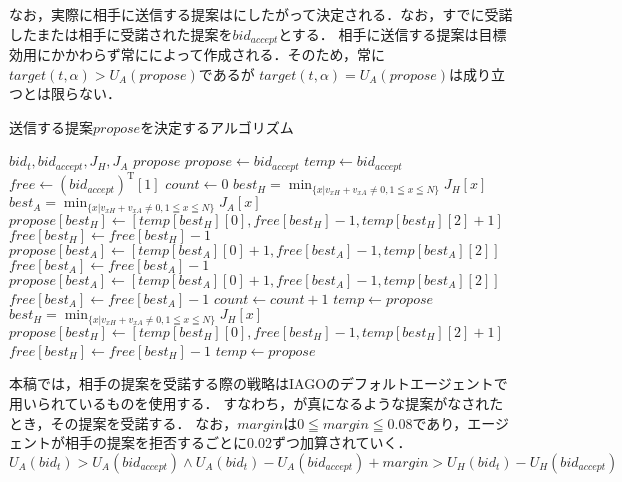 なお，実際に相手に送信する提案はにしたがって決定される．なお，すでに受諾したまたは相手に受諾された提案を$bid_{accept}$とする．
相手に送信する提案は目標効用にかかわらず常にによって作成される．そのため，常に$target(t,\alpha) > U_A(propose)$であるが
$target(t,\alpha) = U_A(propose)$は成り立つとは限らない．
\begin{algorithm}
    \caption{送信する提案$propose$を決定するアルゴリズム}\label{alg:bidding}
    \begin{algorithmic}[1]
        \renewcommand{\algorithmicrequire}{\textbf{Input:}}
        \renewcommand{\algorithmicensure}{\textbf{Output:}}
        \REQUIRE $bid_t,bid_{accept}, J_H, J_A$
        \ENSURE  $propose$
        \STATE $propose \leftarrow bid_{accept}$
        \STATE $temp \leftarrow bid_{accept}$
        \STATE $free \leftarrow (bid_{accept})^{\mathrm{T}}[1]$
        \STATE $count \leftarrow 0$
            \STATE $best_H = \displaystyle \min_{\{x | v_{xH} + v_{xA} \neq 0, 1 \leqq x \leqq N \} } J_H[x]$ 
            \STATE $best_A = \displaystyle \min_{\{x | v_{xH} + v_{xA} \neq 0, 1 \leqq x \leqq N \} } J_A[x]$ 
                \STATE $propose[best_H] \leftarrow [temp[best_H][0], free[best_H] - 1, temp[best_H][2] + 1]$
                \STATE $free[best_H] \leftarrow free[best_H] - 1$
                \STATE $propose[best_A] \leftarrow [temp[best_A][0] + 1, free[best_A] - 1, temp[best_A][2]]$
                \STATE $free[best_A] \leftarrow free[best_A] - 1$
            \ELSE
                \STATE $propose[best_A] \leftarrow [temp[best_A][0] + 1, free[best_A] - 1, temp[best_A][2]]$
                \STATE $free[best_A] \leftarrow free[best_A] - 1$
            \ENDIF
            \STATE $count \leftarrow count + 1$
            \STATE $temp \leftarrow propose$
        \ENDWHILE
            \STATE $best_H = \displaystyle \min_{\{x | v_{xH} + v_{xA} \neq 0, 1 \leqq x \leqq N \} } J_H[x]$ 
            \STATE $propose[best_H] \leftarrow [temp[best_H][0], free[best_H] - 1, temp[best_H][2] + 1]$
            \STATE $free[best_H] \leftarrow free[best_H] - 1$
            \STATE $temp \leftarrow propose$
        \ENDWHILE
    \end{algorithmic}
\end{algorithm}

本稿では，相手の提案を受諾する際の戦略はIAGOのデフォルトエージェントで用いられているものを使用する．
すなわち，が真になるような提案がなされたとき，その提案を受諾する．
なお，$margin$は$0 \leqq margin \leqq 0.08$であり，エージェントが相手の提案を拒否するごとに0.02ずつ加算されていく．
\begin{equation}
    U_A(bid_t) > U_A(bid_{accept}) \wedge U_A(bid_t) - U_A(bid_{accept}) + margin > U_H(bid_t) - U_H(bid_{accept}) 
    \label{eq:acceptance}
\end{equation}

